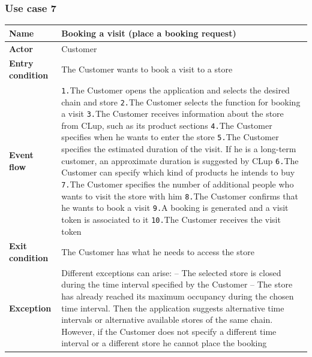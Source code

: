 \documentclass[a4paper,oneside,11pt]{book}   %
\begin{document}
    \subsubsection{Use case 7}
    \begin{longtable}[c] { |>{\bfseries{}}C{0.25\textwidth}|H{0.55\textwidth}| }
        \hline
        Name            & Booking a visit (place a booking request) \\ \hline
        Actor           & Customer \\ \hline
        Entry condition & The Customer wants to book a visit to a store \\ \hline
        Event flow      & 
        \texttt{1.}The Customer opens the application and selects the desired chain and store \newline
        \texttt{2.}The Customer selects the function for booking a visit \newline
        \texttt{3.}The Customer receives information about the store from CLup, such as its product sections \newline
        \texttt{4.}The Customer specifies when he wants to enter the store \newline
        \texttt{5.}The Customer specifies the estimated duration of the visit. If he is a long-term customer, an approximate duration is suggested by CLup \newline
        \texttt{6.}The Customer can specify which kind of products he intends to buy \newline
        \texttt{7.}The Customer specifies the number of additional people who wants to visit the store with him  \newline
        \texttt{8.}The Customer confirms that he wants to book a visit \newline
        \texttt{9.}A booking is generated and a visit token is associated to it \newline
        \texttt{10.}The Customer receives the visit token \\ \hline
        Exit condition  & The Customer has what he needs to access the store \\ \hline
        Exception       & Different exceptions can arise: \newline
        -- The selected store is closed during the time interval specified by the Customer \newline
        -- The store has already reached its maximum occupancy during the chosen time interval. Then the application suggests alternative time intervals or alternative available stores of the same chain. However, if the Customer does not specify a different time interval or a different store he cannot place the booking \newline

\end{longtable}
\end{document}
